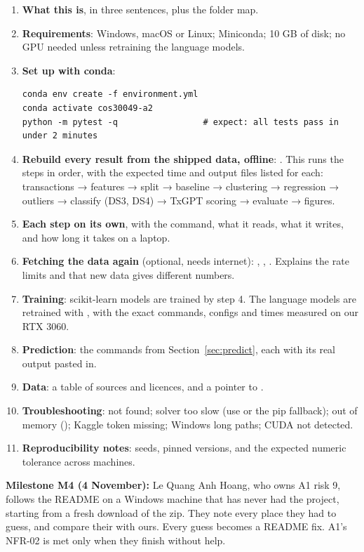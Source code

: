 \begin{enumerate}
  \item \textbf{What this is}, in three sentences, plus the folder map.
  \item \textbf{Requirements}: Windows, macOS or Linux; Miniconda; 10 GB of disk; no GPU needed
    unless retraining the language models.
  \item \textbf{Set up with conda}:
\begin{lstlisting}
conda env create -f environment.yml
conda activate cos30049-a2
python -m pytest -q                 # expect: all tests pass in under 2 minutes
\end{lstlisting}
  \item \textbf{Rebuild every result from the shipped data, offline}:
    . This runs the steps in order, with the expected
    time and output files listed for each: transactions → features → split → baseline →
    clustering → regression → outliers → classify (DS3, DS4) → TxGPT scoring → evaluate →
    figures.
  \item \textbf{Each step on its own}, with the command, what it reads, what it writes, and how
    long it takes on a laptop.
  \item \textbf{Fetching the data again} (optional, needs internet): ,
    , . Explains the rate limits and that new data gives different
    numbers.
  \item \textbf{Training}: scikit-learn models are trained by step 4. The language models are
    retrained with , with the exact commands, configs and times measured
    on our RTX 3060.
  \item \textbf{Prediction}: the commands from Section~\ref{sec:predict}, each with its real
    output pasted in.
  \item \textbf{Data}: a table of sources and licences, and a pointer to .
  \item \textbf{Troubleshooting}:  not found; solver too slow (use  or the
    pip fallback); out of memory (); Kaggle token missing; Windows long paths;
    CUDA not detected.
  \item \textbf{Reproducibility notes}: seeds, pinned versions, and the expected numeric tolerance
    across machines.
\end{enumerate}

\begin{team}
\textbf{Milestone M4 (4 November):} Le Quang Anh Hoang, who owns A1 risk 9, follows the README
on a Windows machine that has never had the project, starting from a fresh download of the zip.
They note every place they had to guess, and compare their  with ours.
Every guess becomes a README fix. A1's NFR-02 is met only when they finish without help.
\end{team}


